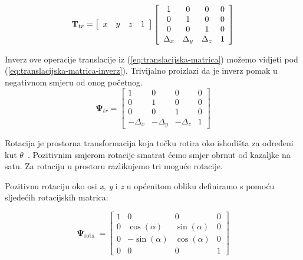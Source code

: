 \documentclass[times, utf8, diplomskirad]{fer}
\begin{document}
\begin{equation}
\bold T_{t r}=
\left[
    \begin{array}{cccc}
        x & y & z & 1 \\
    \end{array}
    \right]
\left[
    \begin{array}{cccc}
        1 & 0 & 0 & 0 \\
        0 & 1 & 0 & 0 \\
        0 & 0 & 1 & 0 \\
        \Delta_x & \Delta_y & \Delta_z & 1
    \end{array}
    \right]
    \label{eq:translacijska-matrica-full}
\end{equation}


Inverz ove operacije translacije iz (\ref{eq:translacijska-matrica}) možemo vidjeti pod (\ref{eq:translacijska-matrica-inverz}).
Trivijalno proizlazi da je inverz pomak u negativnom smjeru od onog početnog.
\begin{equation}
    \boldsymbol{\Psi}_{t r}=\left[
        \begin{array}{cccc}
            1 & 0 & 0 & 0 \\
            0 & 1 & 0 & 0 \\
            0 & 0 & 1 & 0 \\
            -\Delta_x & -\Delta_y & -\Delta_z & 1
        \end{array}
        \right]
    \label{eq:translacijska-matrica-inverz}
\end{equation}

\newpage
Rotacija je prostorna transformacija koja točku rotira oko ishodišta za određeni kut $\theta$~\cite{book:irg}.
Pozitivnim smjerom rotacije smatrat ćemo smjer obrnut od kazaljke na satu.
Za rotaciju u prostoru razlikujemo tri moguće rotacije.

Pozitivnu rotaciju oko osi \textit{x}, \textit{y} i \textit{z} u općenitom obliku definiramo s pomoću sljedećih rotacijskih matrica:

\begin{equation}
    \boldsymbol{\Psi}_{\text {rotx }}=\left[\begin{array}{cccc}
    1 & 0 & 0 & 0 \\
    0 & \cos (\alpha) & \sin (\alpha) & 0 \\
    0 & -\sin (\alpha) & \cos (\alpha) & 0 \\
    0 & 0 & 0 & 1
    \end{array}\right]
    \label{eq:rotacija-x-matrica}
\end{equation}
\end{document}
